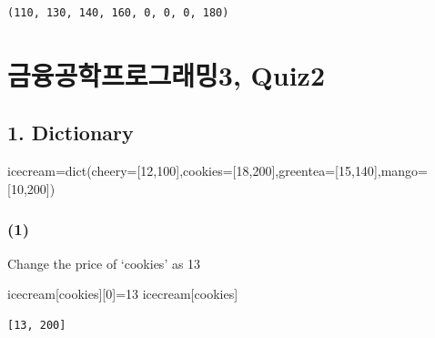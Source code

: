 \documentclass[
  a4paper,
  DIV=11,
  numbers=noendperiod]{scrreprt}
\newenvironment{Shaded}{\begin{snugshade}}{\end{snugshade}}
\newcommand{\BuiltInTok}[1]{\textcolor[rgb]{0.00,0.23,0.31}{#1}}
\newcommand{\DecValTok}[1]{\textcolor[rgb]{0.68,0.00,0.00}{#1}}
\newcommand{\NormalTok}[1]{\textcolor[rgb]{0.00,0.23,0.31}{#1}}
\newcommand{\OperatorTok}[1]{\textcolor[rgb]{0.37,0.37,0.37}{#1}}
\newcommand{\StringTok}[1]{\textcolor[rgb]{0.13,0.47,0.30}{#1}}
\begin{document}
\begin{verbatim}
(110, 130, 140, 160, 0, 0, 0, 180)
\end{verbatim}

\chapter*{금융공학프로그래밍3,
Quiz2}\label{uxae08uxc735uxacf5uxd559uxd504uxb85cuxadf8uxb798uxbc0d3-quiz2}


\section*{1. Dictionary}\label{dictionary}


\begin{Shaded}
\begin{Highlighting}[]
\NormalTok{icecream}\OperatorTok{=}\BuiltInTok{dict}\NormalTok{(cheery}\OperatorTok{=}\NormalTok{[}\DecValTok{12}\NormalTok{,}\DecValTok{100}\NormalTok{],cookies}\OperatorTok{=}\NormalTok{[}\DecValTok{18}\NormalTok{,}\DecValTok{200}\NormalTok{],greentea}\OperatorTok{=}\NormalTok{[}\DecValTok{15}\NormalTok{,}\DecValTok{140}\NormalTok{],mango}\OperatorTok{=}\NormalTok{[}\DecValTok{10}\NormalTok{,}\DecValTok{200}\NormalTok{])}
\end{Highlighting}
\end{Shaded}

\subsection*{(1)}\label{section}

Change the price of `cookies' as 13

\begin{Shaded}
\begin{Highlighting}[]
\NormalTok{icecream[}\StringTok{\textquotesingle{}cookies\textquotesingle{}}\NormalTok{][}\DecValTok{0}\NormalTok{]}\OperatorTok{=}\DecValTok{13}
\NormalTok{icecream[}\StringTok{\textquotesingle{}cookies\textquotesingle{}}\NormalTok{]}
\end{Highlighting}
\end{Shaded}

\begin{verbatim}
[13, 200]
\end{verbatim}
\end{document}
